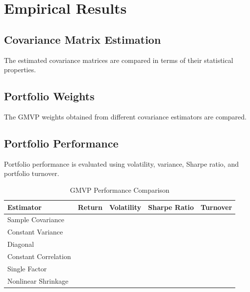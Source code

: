 \documentclass[12pt,a4paper]{article}
\begin{document}
	\section{Empirical Results}
	
	
	\subsection{Covariance Matrix Estimation}
	
	The estimated covariance matrices are compared in terms of
	their statistical properties.
	
	
	\subsection{Portfolio Weights}
	
	The GMVP weights obtained from different covariance
	estimators are compared.
	
	
	\subsection{Portfolio Performance}
	
	Portfolio performance is evaluated using volatility,
	variance, Sharpe ratio, and portfolio turnover.
	
	\begin{table}[htbp]
		
		\centering
		
		\caption{GMVP Performance Comparison}
		
		\begin{tabular}{lrrrr}
			
			\toprule
			
			Estimator &
			Return &
			Volatility &
			Sharpe Ratio &
			Turnover \\
			
			\midrule
			
			Sample Covariance & & & & \\
			Constant Variance & & & & \\
			Diagonal & & & & \\
			Constant Correlation & & & & \\
			Single Factor & & & & \\
			Nonlinear Shrinkage & & & & \\
			
			\bottomrule
			
		\end{tabular}
		
	\end{table}
	
\end{document}
